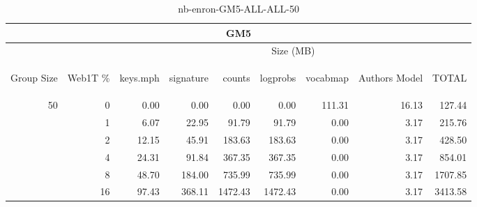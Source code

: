 \begin{center}
\begin{table}[htbp]
\begin{tabular}{ | r | r | r | r | r | r | r | r | r |}
\hline
\multicolumn{9}{|c|}{GM5}\\
\hline
 & & \multicolumn{7}{|c|}{Size (MB)}\\ \cline{3-9}
\begin{sideways}Group Size\end{sideways} & \begin{sideways}Web1T \% \end{sideways} & \begin{sideways}keys.mph\end{sideways} & \begin{sideways}signature\end{sideways} & \begin{sideways}counts\end{sideways} & \begin{sideways}logprobs\end{sideways} & \begin{sideways}vocabmap\end{sideways} & \begin{sideways}Authors Model \end{sideways} & \begin{sideways}TOTAL\end{sideways}\\
\hline
\multirow{5}{*}{50}
 & 0 & 0.00 & 0.00 & 0.00 & 0.00 & 111.31 & 16.13 & 127.44\\ \cline{2-9}
 & 1 & 6.07 & 22.95 & 91.79 & 91.79 & 0.00 & 3.17 & 215.76\\ \cline{2-9}
 & 2 & 12.15 & 45.91 & 183.63 & 183.63 & 0.00 & 3.17 & 428.50\\ \cline{2-9}
 & 4 & 24.31 & 91.84 & 367.35 & 367.35 & 0.00 & 3.17 & 854.01\\ \cline{2-9}
 & 8 & 48.70 & 184.00 & 735.99 & 735.99 & 0.00 & 3.17 & 1707.85\\ \cline{2-9}
 & 16 & 97.43 & 368.11 & 1472.43 & 1472.43 & 0.00 & 3.17 & 3413.58\\ \cline{2-9}
\hline
\end{tabular}
\caption{nb-enron-GM5-ALL-ALL-50}
\label{table:nb-enron-GM5-ALL-ALL-50}
\end{table}
\end{center}


